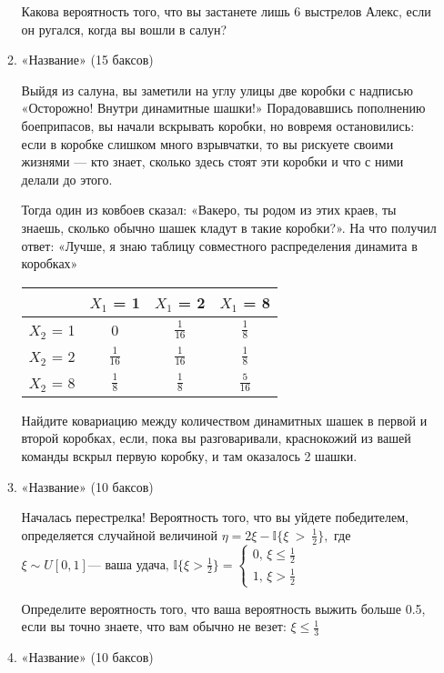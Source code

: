 \documentclass[11pt, a4paper]{article}
\renewcommand{\le}{\leqslant}
\theoremstyle{definition}
\begin{document}
\begin{enumerate}
\begin{enumerate}
    Какова вероятность того, что вы застанете лишь 6 выстрелов Алекс, если он ругался, когда вы вошли в салун?
    \newpage
    \item «Название» (15 баксов)
    
    Выйдя из салуна, вы заметили на углу улицы две коробки с надписью «Осторожно! Внутри динамитные шашки!» Порадовавшись пополнению боеприпасов, вы начали вскрывать коробки, но вовремя остановились: если в коробке слишком много взрывчатки, то вы рискуете своими жизнями — кто знает, сколько здесь стоят эти коробки и что с ними делали до этого.
    
    Тогда один из ковбоев сказал: «Вакеро, ты родом из этих краев, ты знаешь, сколько обычно шашек кладут в такие коробки?». На что получил ответ: «Лучше, я знаю таблицу совместного распределения динамита в коробках»
    \begin{center}
	\begin{tabular}{c|c|c|c}
		 & $X_1$ = 1 & $X_1$ = 2 & $X_1$ = 8 \\
		\hline
		$X_2$ = 1 & 0 & $\frac{1}{16}$ & $\frac{1}{8}$ \\
		\hline
		$X_2$ = 2 & $\frac{1}{16}$ & $\frac{1}{16}$ & $\frac{1}{8}$ \\
		\hline
		$X_2$ = 8 & $\frac{1}{8}$ & $\frac{1}{8}$ & $\frac{5}{16}$ \\
	\end{tabular}
	\end{center}
	
	Найдите ковариацию между количеством динамитных шашек в первой и второй коробках, если, пока вы разговаривали, краснокожий из вашей команды вскрыл первую коробку, и там оказалось 2 шашки.
	
    \item «Название» (10 баксов)
    
    Началась перестрелка! Вероятность того, что вы уйдете победителем, определяется случайной величиной $\eta = 2\xi - \mathbb{I}\{\xi~>~\frac{1}{2}\},$ где $\xi \sim U[0,1] \text{— ваша удача}, \, \mathbb{I}\{\xi > \frac{1}{2}\} =
    \begin{cases}
    0, \, \xi \le \frac{1}{2} \\
    1, \, \xi > \frac{1}{2}
    \end{cases}$
    
    Определите вероятность того, что ваша вероятность выжить больше 0.5, если вы точно знаете, что вам обычно не везет: $\xi \le \frac{1}{3}$
    
    \item «Название» (10 баксов)
    

\end{enumerate}
\end{enumerate}
\end{document}

